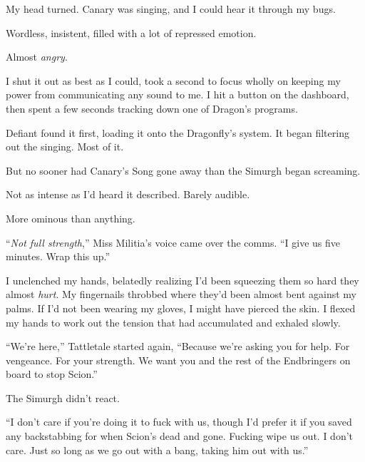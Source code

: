 My head turned.  Canary was singing, and I could hear it through my bugs.



Wordless, insistent, filled with a lot of repressed emotion.



Almost \emph{angry}.



I shut it out as best as I could, took a second to focus wholly on keeping my power from communicating any sound to me.  I hit a button on the dashboard, then spent a few seconds tracking down one of Dragon's programs.



Defiant found it first, loading it onto the Dragonfly's system.  It began filtering out the singing.  Most of it.



But no sooner had Canary's Song gone away than the Simurgh began screaming.



Not as intense as I'd heard it described.  Barely audible.



More ominous than anything.



``\emph{Not full strength},'' Miss Militia's voice came over the comms.  ``I give us five minutes.  Wrap this up.''



I unclenched my hands, belatedly realizing I'd been squeezing them so hard they almost \emph{hurt}.  My fingernails throbbed where they'd been almost bent against my palms.  If I'd not been wearing my gloves, I might have pierced the skin.  I flexed my hands to work out the tension that had accumulated and exhaled slowly.



``We're here,'' Tattletale started again, ``Because we're asking you for help.  For vengeance.  For your strength.  We want you and the rest of the Endbringers on board to stop Scion.''



The Simurgh didn't react.



``I don't care if you're doing it to fuck with us, though I'd prefer it if you saved any backstabbing for when Scion's dead and gone.  Fucking wipe us out.  I don't care.  Just so long as we go out with a bang, taking him out with us.''




